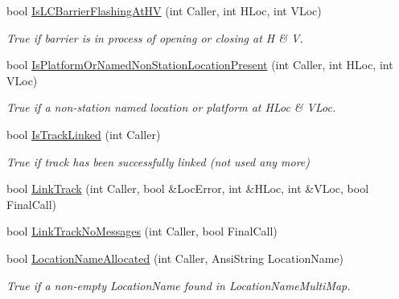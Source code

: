 \begin{DoxyCompactItemize}
bool \mbox{\hyperlink{class_t_track_a96468affb70f97173d882afefbec9fb2}{Is\+L\+C\+Barrier\+Flashing\+At\+HV}} (int Caller, int H\+Loc, int V\+Loc)
\begin{DoxyCompactList}\small\item\em True if barrier is in process of opening or closing at H \& V. \end{DoxyCompactList}\item 
\mbox{\label{class_t_track_adbec6561f4ecd2fa1dabf3e41502b085}} 
bool \mbox{\hyperlink{class_t_track_adbec6561f4ecd2fa1dabf3e41502b085}{Is\+Platform\+Or\+Named\+Non\+Station\+Location\+Present}} (int Caller, int H\+Loc, int V\+Loc)
\begin{DoxyCompactList}\small\item\em True if a non-\/station named location or platform at H\+Loc \& V\+Loc. \end{DoxyCompactList}\item 
\mbox{\label{class_t_track_ac0c7fcb151e24dd265a94136db9b6a58}} 
bool \mbox{\hyperlink{class_t_track_ac0c7fcb151e24dd265a94136db9b6a58}{Is\+Track\+Linked}} (int Caller)
\begin{DoxyCompactList}\small\item\em True if track has been successfully linked (not used any more) \end{DoxyCompactList}\item 
bool \mbox{\hyperlink{class_t_track_a17b6095b0c8de0e1493eeebd6d534247}{Link\+Track}} (int Caller, bool \&Loc\+Error, int \&H\+Loc, int \&V\+Loc, bool Final\+Call)
\item 
bool \mbox{\hyperlink{class_t_track_a42f410832651458a4a34769ef95be51b}{Link\+Track\+No\+Messages}} (int Caller, bool Final\+Call)
\item 
\mbox{\label{class_t_track_adf9b0df7c51a36a4fca3a4ced7cc4a35}} 
bool \mbox{\hyperlink{class_t_track_adf9b0df7c51a36a4fca3a4ced7cc4a35}{Location\+Name\+Allocated}} (int Caller, Ansi\+String Location\+Name)
\begin{DoxyCompactList}\small\item\em True if a non-\/empty Location\+Name found in Location\+Name\+Multi\+Map. \end{DoxyCompactList}\item 
\mbox{\label{class_t_track_ad7d7ef450424ea6aab50db5445c6448c}} 

\end{DoxyCompactItemize}
